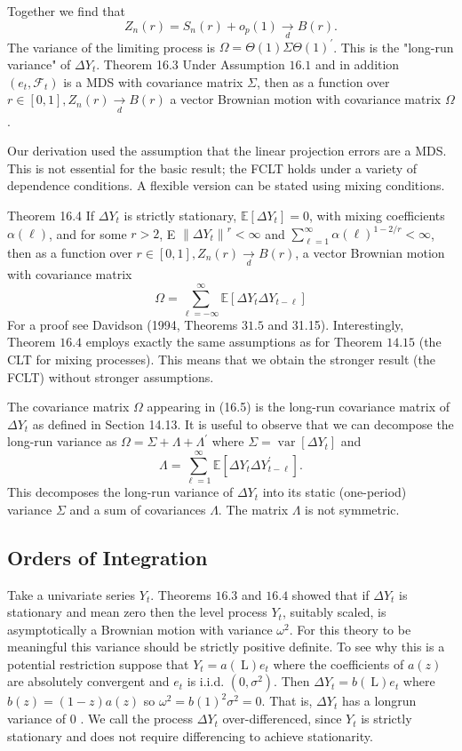 \documentclass[10pt]{article}
\begin{document}
Together we find that
$$
Z_{n}(r)=S_{n}(r)+o_{p}(1) \underset{d}{\longrightarrow} B(r) .
$$
The variance of the limiting process is $\Omega=\Theta(1) \Sigma \Theta(1)^{\prime}$. This is the "long-run variance" of $\Delta Y_{t}$. Theorem 16.3 Under Assumption $16.1$ and in addition $\left(e_{t}, \mathscr{F}_{t}\right)$ is a MDS with covariance matrix $\Sigma$, then as a function over $r \in[0,1], Z_{n}(r) \underset{d}{\rightarrow} B(r)$ a vector Brownian motion with covariance matrix $\Omega$.

Our derivation used the assumption that the linear projection errors are a MDS. This is not essential for the basic result; the FCLT holds under a variety of dependence conditions. A flexible version can be stated using mixing conditions.

Theorem 16.4 If $\Delta Y_{t}$ is strictly stationary, $\mathbb{E}\left[\Delta Y_{t}\right]=0$, with mixing coefficients $\alpha(\ell)$, and for some $r>2$, E $\left\|\Delta Y_{t}\right\|^{r}<\infty$ and $\sum_{\ell=1}^{\infty} \alpha(\ell)^{1-2 / r}<\infty$, then as a function over $r \in[0,1], Z_{n}(r) \underset{d}{\longrightarrow} B(r)$, a vector Brownian motion with covariance matrix
$$
\Omega=\sum_{\ell=-\infty}^{\infty} \mathbb{E}\left[\Delta Y_{t} \Delta Y_{t-\ell}\right]
$$
For a proof see Davidson (1994, Theorems $31.5$ and 31.15). Interestingly, Theorem $16.4$ employs exactly the same assumptions as for Theorem $14.15$ (the CLT for mixing processes). This means that we obtain the stronger result (the FCLT) without stronger assumptions.

The covariance matrix $\Omega$ appearing in (16.5) is the long-run covariance matrix of $\Delta Y_{t}$ as defined in Section 14.13. It is useful to observe that we can decompose the long-run variance as $\Omega=\Sigma+\Lambda+\Lambda^{\prime}$ where $\Sigma=\operatorname{var}\left[\Delta Y_{t}\right]$ and
$$
\Lambda=\sum_{\ell=1}^{\infty} \mathbb{E}\left[\Delta Y_{t} \Delta Y_{t-\ell}^{\prime}\right] .
$$
This decomposes the long-run variance of $\Delta Y_{t}$ into its static (one-period) variance $\Sigma$ and a sum of covariances $\Lambda$. The matrix $\Lambda$ is not symmetric.

\subsection{Orders of Integration}
Take a univariate series $Y_{t}$. Theorems $16.3$ and $16.4$ showed that if $\Delta Y_{t}$ is stationary and mean zero then the level process $Y_{t}$, suitably scaled, is asymptotically a Brownian motion with variance $\omega^{2}$. For this theory to be meaningful this variance should be strictly positive definite. To see why this is a potential restriction suppose that $Y_{t}=a(\mathrm{~L}) e_{t}$ where the coefficients of $a(z)$ are absolutely convergent and $e_{t}$ is i.i.d. $\left(0, \sigma^{2}\right)$. Then $\Delta Y_{t}=b(\mathrm{~L}) e_{t}$ where $b(z)=(1-z) a(z)$ so $\omega^{2}=b(1)^{2} \sigma^{2}=0$. That is, $\Delta Y_{t}$ has a longrun variance of 0 . We call the process $\Delta Y_{t}$ over-differenced, since $Y_{t}$ is strictly stationary and does not require differencing to achieve stationarity.
\end{document}

